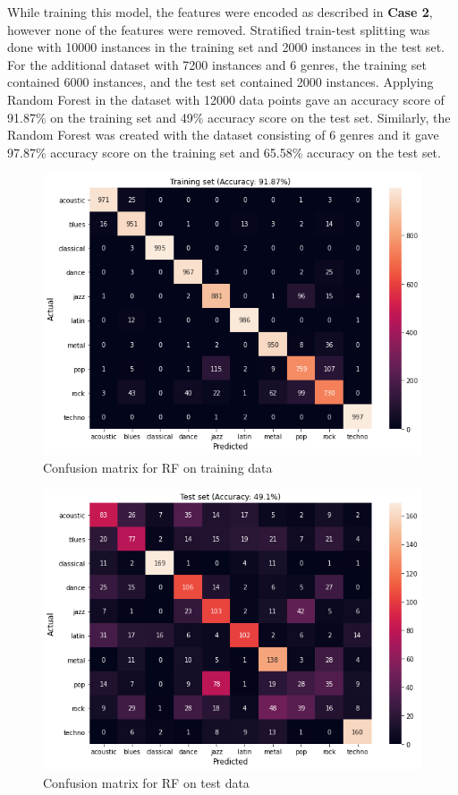 \documentclass[conference]{IEEEtran}
\begin{document}
While training this model, the features were encoded as described in \textbf{\textbf{Case 2}}, however none of the features were removed. Stratified train-test splitting was done with 10000 instances in the training set and 2000 instances in the test set. For the additional dataset with 7200 instances and 6 genres, the training set contained 6000 instances, and the test set contained 2000 instances. Applying Random Forest in the dataset with 12000 data points gave an accuracy score of 91.87\% on the training set and 49\% accuracy score on the test set. Similarly, the Random Forest was created with the dataset consisting of 6 genres and it gave 97.87\% accuracy score on the training set and 65.58\% accuracy on the test set.

\begin{figure}[htbp]
\centering
\includegraphics[width=.9\linewidth]{./images/rf_heatmap_train.png}
\caption{Confusion matrix for RF on training data}
\end{figure}

\begin{figure}[htbp]
\centering
\includegraphics[width=.9\linewidth]{./images/rf_heatmap_test.png}
\caption{Confusion matrix for RF on test data}
\end{figure}
\end{document}
